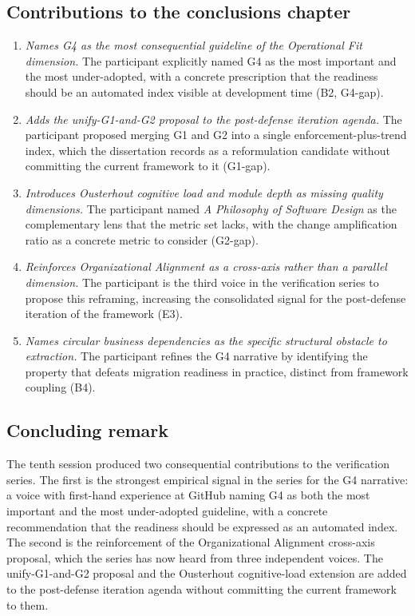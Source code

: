 \subsection*{Contributions to the conclusions chapter}

\begin{enumerate}[itemsep=4pt,topsep=2pt]
  \item \emph{Names G4 as the most consequential guideline of the Operational Fit dimension.} The participant explicitly named G4 as the most important and the most under-adopted, with a concrete prescription that the readiness should be an automated index visible at development time (B2, G4-gap).
  \item \emph{Adds the unify-G1-and-G2 proposal to the post-defense iteration agenda.} The participant proposed merging G1 and G2 into a single enforcement-plus-trend index, which the dissertation records as a reformulation candidate without committing the current framework to it (G1-gap).
  \item \emph{Introduces Ousterhout cognitive load and module depth as missing quality dimensions.} The participant named \emph{A Philosophy of Software Design} as the complementary lens that the metric set lacks, with the change amplification ratio as a concrete metric to consider (G2-gap).
  \item \emph{Reinforces Organizational Alignment as a cross-axis rather than a parallel dimension.} The participant is the third voice in the verification series to propose this reframing, increasing the consolidated signal for the post-defense iteration of the framework (E3).
  \item \emph{Names circular business dependencies as the specific structural obstacle to extraction.} The participant refines the G4 narrative by identifying the property that defeats migration readiness in practice, distinct from framework coupling (B4).
\end{enumerate}

\subsection*{Concluding remark}

The tenth session produced two consequential contributions to the verification series. The first is the strongest empirical signal in the series for the G4 narrative: a voice with first-hand experience at GitHub naming G4 as both the most important and the most under-adopted guideline, with a concrete recommendation that the readiness should be expressed as an automated index. The second is the reinforcement of the Organizational Alignment cross-axis proposal, which the series has now heard from three independent voices. The unify-G1-and-G2 proposal and the Ousterhout cognitive-load extension are added to the post-defense iteration agenda without committing the current framework to them.
